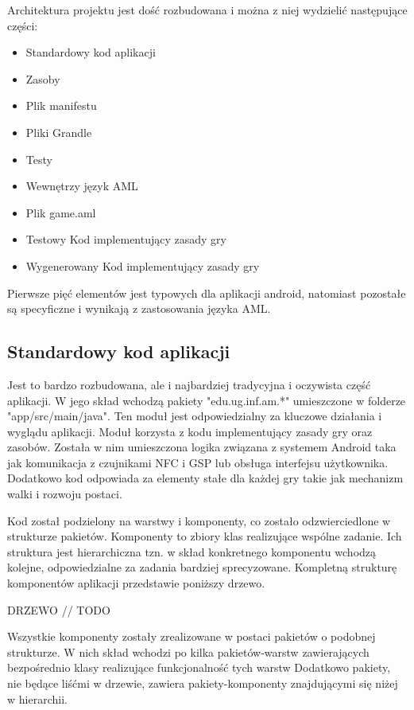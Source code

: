 \documentclass	{xmgr}
\begin{document}
Architektura projektu jest dość rozbudowana i można z niej wydzielić następujące części:

\begin{itemize}
	\item Standardowy kod aplikacji
	\item Zasoby
	\item Plik manifestu
	\item Pliki Grandle
	\item Testy
	\item Wewnętrzy język AML
	\item Plik game.aml
	\item Testowy Kod implementujący zasady gry
	\item Wygenerowany Kod implementujący zasady gry
\end{itemize}

Pierwsze pięć elementów jest typowych dla aplikacji android, natomiast pozostałe są specyficzne i wynikają z zastosowania języka AML.

\subsection{Standardowy kod aplikacji} 

Jest to bardzo rozbudowana, ale i najbardziej tradycyjna i oczywista część aplikacji. W jego skład wchodzą pakiety "edu.ug.inf.am.*" umieszczone w folderze "app/src/main/java". Ten moduł jest odpowiedzialny za kluczowe działania i wyglądu aplikacji. Moduł korzysta z kodu implementujący zasady gry oraz zasobów. Została w nim umieszczona logika związana z systemem Android taka jak komunikacja z czujnikami NFC i GSP lub obsługa interfejsu użytkownika. Dodatkowo kod odpowiada za elementy stałe dla każdej gry takie jak mechanizm walki i rozwoju postaci.

Kod został podzielony na warstwy i komponenty, co zostało odzwierciedlone w strukturze pakietów. 
Komponenty to zbiory klas realizujące wspólne zadanie. Ich struktura jest hierarchiczna tzn. w skład konkretnego komponentu wchodzą kolejne, odpowiedzialne za zadania bardziej sprecyzowane. Kompletną strukturę komponentów aplikacji przedstawie poniższy drzewo.

DRZEWO // TODO

Wszystkie komponenty zostały zrealizowane w postaci pakietów o podobnej strukturze. W nich skład wchodzi po kilka pakietów-warstw zawierających bezpośrednio klasy realizujące funkcjonalność tych warstw Dodatkowo pakiety, nie będące liśćmi w drzewie, zawiera pakiety-komponenty znajdującymi się niżej w hierarchii.
\end{document}
